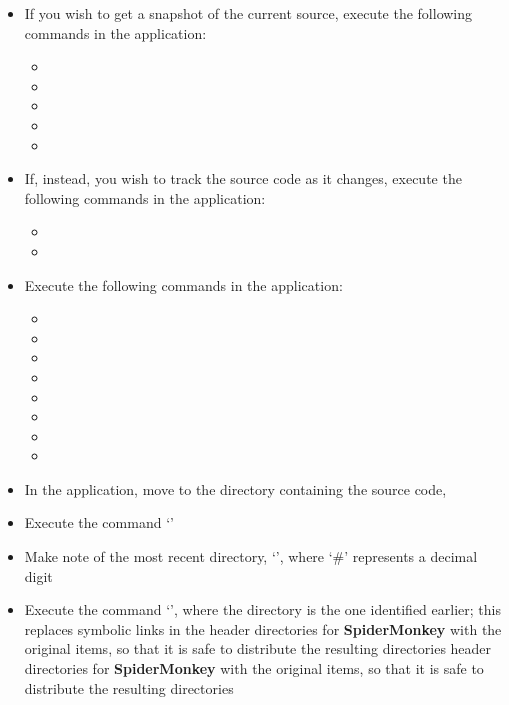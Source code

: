 \begin{itemize}
\item If you wish to get a snapshot of the current source, execute the following
commands in the  application:
\begin{itemize}
\item {}
\item\exSp{}
\item\exSp{}
\item\exSp{}
\item\exSp{}
\end{itemize}
\item\exSp{}If, instead, you wish to track the source code as it changes, execute the
following commands in the  application:
\begin{itemize}
\item {}
\item\exSp{}
\end{itemize}
\item\exSp{}Execute the following commands in the  application:
\begin{itemize}
\item\exSp{}
\item\exSp{}
\item\exSp{}
\item\exSp{}
\item\exSp{}
\item\exSp{}
\item\exSp{}
\item\exSp{}
\end{itemize}
\item\exSp{}In the  application, move to the directory containing the
\mplusm{} source code, 
\item\exSp{}Execute the command `'
\item\exSp{}Make note of the most recent directory, `',
where `\#' represents a decimal digit
\item\exSp{}Execute the command `', where the directory is the one
identified earlier;
this replaces symbolic links in the header directories for \textbf{SpiderMonkey} with the
original items, so that it is safe to distribute the resulting directories
header directories for \textbf{SpiderMonkey} with the original items, so that it is safe
to distribute the resulting directories
\end{itemize}
